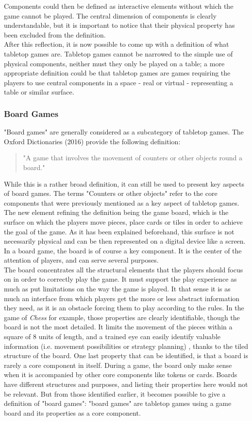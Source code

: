Components could then be defined as interactive elements without which the game cannot be played. The central dimension of components is clearly understandable, but it is important to notice that their physical property has been excluded from the definition.\\
After this reflection, it is now possible to come up with a definition of what tabletop games are. Tabletop games cannot be narrowed to the simple use of physical components, neither must they only be played on a table; a more appropriate definition could be that tabletop games are games requiring the players to use central components in a space - real or virtual - representing a table or similar surface.
\subsubsection{Board Games}
"Board games" are generally considered as a subcategory of tabletop games. The Oxford Dictionaries (2016) provide the following definition:
\begin{quotation}
"A game that involves the movement of counters or other objects round a board."
\end{quotation}
While this is a rather broad definition, it can still be used to present key aspects of board games. The terms "Counters or other objects" refer to the core components that were previously mentioned as a key aspect of tabletop games. The new element refining the definition being the game board, which is the surface on which the players move pieces, place cards or tiles in order to achieve the goal of the game. As it has been explained beforehand, this surface is not necessarily physical and can be then represented on a digital device like a screen. In a board game, the board is of course a key component. It is the center of the attention of players, and can serve several purposes.\\
The board concentrates all the structural elements that the players should focus on in order to correctly play the game. It must support the play experience as much as put limitations on the way the game is played. It that sense it is as much an interface from which players get the more or less abstract information they need, as it is an obstacle forcing them to play according to the rules. In the game of \textit{Chess} for example, those properties are clearly identifiable, though the board is not the most detailed. It limits the movement of the pieces within a square of 8 units of length, and a trained eye can easily identify valuable information (i.e. movement possibilities or strategy planning) , thanks to the tiled structure of the board. One last property that can be identified, is that a board is rarely a core component in itself. During a game, the board only make sense when it is accompanied by other core components like tokens or cards. Boards have different structures and purposes, and listing their properties here would not be relevant. But from those identified earlier, it becomes possible to give a definition of "board games": "board games" are tabletop games using a game board and its properties as a core component.
